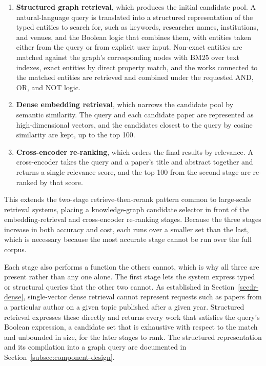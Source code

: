 \begin{enumerate}
    \item \textbf{Structured graph retrieval}, which produces the initial candidate pool. A natural-language query is translated into a structured representation of the typed entities to search for, such as keywords, researcher names, institutions, and venues, and the Boolean logic that combines them, with entities taken either from the query or from explicit user input. Non-exact entities are matched against the graph's corresponding nodes with BM25 over text indexes, exact entities by direct property match, and the works connected to the matched entities are retrieved and combined under the requested AND, OR, and NOT logic.
    \item \textbf{Dense embedding retrieval}, which narrows the candidate pool by semantic similarity. The query and each candidate paper are represented as high-dimensional vectors, and the candidates closest to the query by cosine similarity are kept, up to the top 100.
    \item \textbf{Cross-encoder re-ranking}, which orders the final results by relevance. A cross-encoder takes the query and a paper's title and abstract together and returns a single relevance score, and the top 100 from the second stage are re-ranked by that score.
\end{enumerate}

This extends the two-stage retrieve-then-rerank pattern common to large-scale retrieval systems, placing a knowledge-graph candidate selector in front of the embedding-retrieval and cross-encoder re-ranking stages. Because the three stages increase in both accuracy and cost, each runs over a smaller set than the last, which is necessary because the most accurate stage cannot be run over the full corpus.

Each stage also performs a function the others cannot, which is why all three are present rather than any one alone. The first stage lets the system express typed or structural queries that the other two cannot. As established in Section~\ref{sec:lr-dense}, single-vector dense retrieval cannot represent requests such as papers from a particular author on a given topic published after a given year. Structured retrieval expresses these directly and returns every work that satisfies the query's Boolean expression, a candidate set that is exhaustive with respect to the match and unbounded in size, for the later stages to rank. The structured representation and its compilation into a graph query are documented in Section~\ref{subsec:component-design}.

